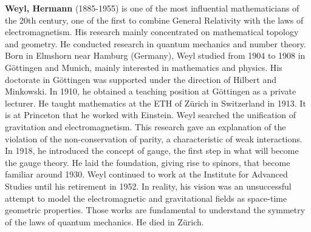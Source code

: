 \textbf{Weyl, Hermann} (1885-1955) is one of the most influential mathematicians of the 20th century, one of the first to combine General Relativity with the laws of electromagnetism. His research mainly concentrated on mathematical topology and geometry. He conducted research in quantum mechanics and number theory. Born in Elmshorn near Hamburg (Germany), Weyl studied from 1904 to 1908 in Göttingen and Munich, mainly interested in mathematics and physics. His doctorate in Göttingen was supported under the direction of Hilbert and Minkowski. In 1910, he obtained a teaching position at Göttingen as a private lecturer. He taught mathematics at the ETH of Zürich in Switzerland in 1913. It is at Princeton that he worked with Einstein. Weyl searched the unification of gravitation and electromagnetism. This research gave an explanation of the violation of the non-conservation of parity, a characteristic of weak interactions. In 1918, he introduced the concept of gauge, the first step in what will become the gauge theory. He laid the foundation, giving rise to spinors, that become familiar around 1930. Weyl continued to work at the Institute for Advanced Studies until his retirement in 1952. In reality, his vision was an unsuccessful attempt to model the electromagnetic and gravitational fields as space-time geometric properties. Those works are fundamental to understand the symmetry of the laws of quantum mechanics. He died in Zürich.

